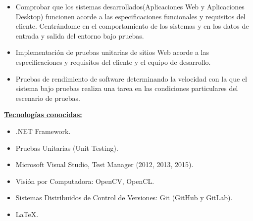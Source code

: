 \documentclass[letterpaper, 12pt, final]{report}
\begin{document}
\begin{itemize}[noitemsep, nolistsep]

	\item Comprobar que los sistemas desarrollados(Aplicaciones Web y Aplicaciones Desktop) funcionen acorde a las especificaciones funcionales y requisitos del cliente. Centrándome en el comportamiento de los sistemas y en los datos de entrada y salida del entorno bajo pruebas.
	
	\item Implementación de pruebas unitarias de sitios Web acorde a las especificaciones y requisitos del cliente y el equipo de desarrollo.
	
	\item Pruebas de rendimiento de software determinando la velocidad con la que el sistema bajo pruebas realiza una tarea en las condiciones particulares del escenario de pruebas.\\
	
%	
%

\end{itemize}


\underline{\textbf{Tecnologías conocidas:}}

\begin{itemize}[noitemsep, nolistsep]

    \item .NET Framework.
    
    \item Pruebas Unitarias (Unit Testing).

	\item Microsoft Visual Studio, Test Manager  (2012, 2013, 2015).
	\item Visión por Computadora: OpenCV, OpenCL.
	
	\item Sistemas Distribuidos de Control de Versiones: Git (GitHub y GitLab).
	
	\item \LaTeX .\\
			
	\end{itemize}
\end{document}
